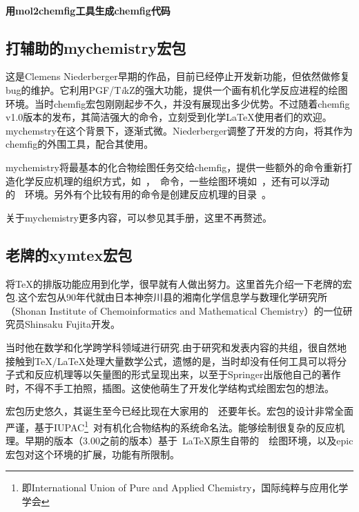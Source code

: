 \documentclass[a4paper,UTF8,zihao = -4]{ctexart} %
\providecommand{\tikzlg}{PGF/T\textit{i}kZ}
\begin{document}
\paragraph{用\textsf{mol2chemfig}工具生成\textsf{chemfig}代码}



\subsection{打辅助的\textsf{mychemistry}宏包}
\label{sec:mychemistry}

这是Clemens Niederberger早期的作品，目前已经停止开发新功能，但依然做修复bug的维护。它利用\tikzlg{}的强大功能，提供一个画有机化学反应进程的绘图环境。当时\textsf{chemfig}宏包刚刚起步不久，并没有展现出多少优势。不过随着\textsf{chemfig} \textsf{v}1.0版本的发布，其简洁强大的命令，立刻受到化学\LaTeX{}使用者们的欢迎。\textsf{mychemstry}在这个背景下，逐渐式微。Niederberger调整了开发的方向，将其作为\textsf{chemfig}的外围工具，配合其使用。

\textsf{mychemistry}将最基本的化合物绘图任务交给\textsf{chemfig}，提供一些额外的命令重新打造化学反应机理的组织方式，如~，~命令，一些绘图环境如~，还有可以浮动的~~环境。另外有个比较有用的命令是创建反应机理的目录~。

关于\textsf{mychemistry}更多内容，可以参见其手册，这里不再赘述。

\subsection{老牌的\textsf{xymtex}宏包}
\label{sec:xymtexIntro}

将\TeX{}的排版功能应用到化学，很早就有人做出努力。这里首先介绍一下老牌的\XyMTeX{}宏包.这个宏包从90年代就由日本神奈川县的湘南化学信息学与数理化学研究所（Shonan Institute of Chemoinformatics and Mathematical Chemistry）的一位研究员Shinsaku Fujita开发。

当时他在数学和化学跨学科领域进行研究.由于研究和发表内容的共组，很自然地接触到\TeX{}/\LaTeX{}处理大量数学公式，遗憾的是，当时却没有任何工具可以将分子式和反应机理等以矢量图的形式呈现出来，以至于Springer出版他自己的著作时，不得不手工拍照，插图。这使他萌生了开发化学结构式绘图宏包的想法。

\XyMTeX{}宏包历史悠久，其诞生至今已经比现在大家用的~\LaTeXe{}~还要年长。宏包的设计非常全面严谨，基于IUPAC\footnote{即International Union of Pure and Applied Chemistry，国际纯粹与应用化学学会}~对有机化合物结构的系统命名法。能够绘制很复杂的反应机理。早期的版本（3.00之前的版本）基于~\LaTeX{}原生自带的~~绘图环境，以及\textsf{epic}宏包对这个环境的扩展，功能有所限制。
\end{document}

